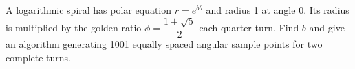 A logarithmic spiral has polar equation $r=e^{b\theta}$ and radius 1 at angle 0. Its radius is multiplied by the golden ratio $\phi=\dfrac{1+\sqrt5}{2}$ each quarter-turn. Find $b$ and give an algorithm generating 1001 equally spaced angular sample points for two complete turns.
